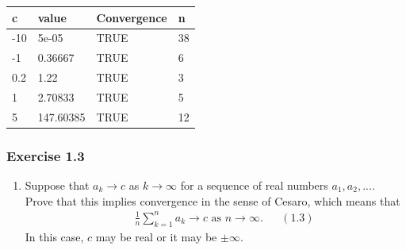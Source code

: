 \documentclass[12pt,]{article}
\providecommand{\tightlist}{%
  \setlength{\itemsep}{0pt}\setlength{\parskip}{0pt}}
\begin{document}
\begin{longtable}[]{@{}llll@{}}
\toprule
c & value & Convergence & n\tabularnewline
\midrule
\endhead
-10 & 5e-05 & TRUE & 38\tabularnewline
-1 & 0.36667 & TRUE & 6\tabularnewline
0.2 & 1.22 & TRUE & 3\tabularnewline
1 & 2.70833 & TRUE & 5\tabularnewline
5 & 147.60385 & TRUE & 12\tabularnewline
\bottomrule
\end{longtable}

\hypertarget{exercise-1.3}{%
\subsubsection{Exercise 1.3}\label{exercise-1.3}}

\begin{enumerate}
\def\labelenumi{\alph{enumi}.}
\tightlist
\item
  Suppose that \(a_k \rightarrow c\) as \(k \rightarrow \infty\) for a
  sequence of real numbers \(a_1, a_2, ...\). Prove that this implies
  convergence in the sense of Cesaro, which means that \begin{align*}
  &&\frac{1}{n}\sum_{k=1}^n a_k \rightarrow c \text{ as } n \rightarrow \infty. && (1.3)
  \end{align*} In this case, \(c\) may be real or it may be
  \(\pm\infty\).
\end{enumerate}
\end{document}
